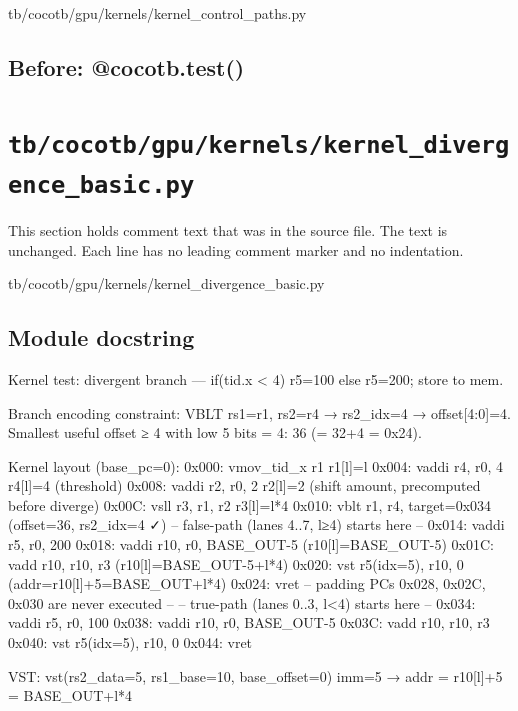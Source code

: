 \begin{relocated}{tb/cocotb/gpu/kernels/kernel_control_paths.py}
\subsection*{Before: @cocotb.test()}


\end{relocated}

\section{\texttt{tb/cocotb/gpu/kernels/kernel\_divergence\_basic.py}}\label{tm:suite:gpu-kernels-kernel-divergence-basic}

This section holds comment text that was in the source file. The text is unchanged. Each line has no leading comment marker and no indentation.

\begin{relocated}{tb/cocotb/gpu/kernels/kernel_divergence_basic.py}

\subsection*{Module docstring}

\begin{textblock}
Kernel test: divergent branch — if(tid.x < 4) r5=100 else r5=200; store to mem.

Branch encoding constraint: VBLT rs1=r1, rs2=r4 → rs2_idx=4 → offset[4:0]=4.
Smallest useful offset ≥ 4 with low 5 bits = 4: 36 (= 32+4 = 0x24).

Kernel layout (base_pc=0):
0x000: vmov_tid_x r1         r1[l]=l
0x004: vaddi r4, r0, 4       r4[l]=4 (threshold)
0x008: vaddi r2, r0, 2       r2[l]=2 (shift amount, precomputed before diverge)
0x00C: vsll  r3, r1, r2      r3[l]=l*4
0x010: vblt  r1, r4, target=0x034  (offset=36, rs2_idx=4 ✓)
-- false-path (lanes 4..7, l≥4) starts here --
0x014: vaddi r5, r0, 200
0x018: vaddi r10, r0, BASE_OUT-5   (r10[l]=BASE_OUT-5)
0x01C: vadd  r10, r10, r3          (r10[l]=BASE_OUT-5+l*4)
0x020: vst   r5(idx=5), r10, 0    (addr=r10[l]+5=BASE_OUT+l*4)
0x024: vret
-- padding PCs 0x028, 0x02C, 0x030 are never executed --
-- true-path (lanes 0..3, l<4) starts here --
0x034: vaddi r5, r0, 100
0x038: vaddi r10, r0, BASE_OUT-5
0x03C: vadd  r10, r10, r3
0x040: vst   r5(idx=5), r10, 0
0x044: vret

VST: vst(rs2_data=5, rs1_base=10, base_offset=0)
imm=5 → addr = r10[l]+5 = BASE_OUT+l*4
\end{textblock}

\end{relocated}


